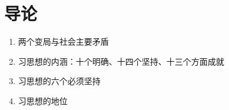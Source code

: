 \documentclass[UTF8]{ctexart}
\begin{document}
\newpage
{}
\BgThispage
\setcounter{section}{-1}
\section{导论}\label{sec:0}

\begin{summary}
\begin{enumerate}
    \item 两个变局与社会主要矛盾
    \item 习思想的内涵：十个明确、十四个坚持、十三个方面成就
    \item 习思想的六个必须坚持
    \item 习思想的地位
\end{enumerate}
\end{summary}
\end{document}
